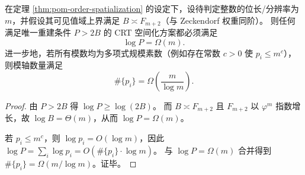 \begin{corollary}\label{cor:pom-order-spatialization-prime-budget}
在定理 \ref{thm:pom-order-spatialization} 的设定下，设待判定整数的位长/分辨率为 \(m\)，并假设其可见值域上界满足 \(B\asymp F_{m+2}\)（与 Zeckendorf 权重同阶）。
则任何满足唯一重建条件 \(P>2B\) 的 CRT 空间化方案都必须满足
\[
\log P=\Omega(m).
\]
进一步地，若所有模数均为多项式规模素数（例如存在常数 \(c>0\) 使 \(p_i\le m^c\)），则模轴数量满足
\[
\#\{p_i\}=\Omega\!\left(\frac{m}{\log m}\right).
\]
\end{corollary}
\begin{proof}
由 \(P>2B\) 得 \(\log P\ge \log(2B)\)。
而 \(B\asymp F_{m+2}\) 且 \(F_{m+2}\) 以 \(\varphi^m\) 指数增长，故 \(\log B=\Theta(m)\)，从而 \(\log P=\Omega(m)\)。
\par
若 \(p_i\le m^c\)，则 \(\log p_i=O(\log m)\)，因此
\(
\log P=\sum_i \log p_i=O(\#\{p_i\}\cdot \log m)
\)。
与 \(\log P=\Omega(m)\) 合并得到 \(\#\{p_i\}=\Omega(m/\log m)\)。证毕。
\end{proof}

